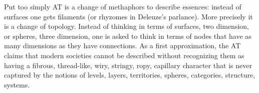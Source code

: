\begin{citacaoabnt}
Put too simply AT is a change of methaphors to describe essences: instead of surfaces one gets filaments (or rhyzomes in Deleuze's parlance). More precisely it is a change of topology. Instead of thinking in terms of surfaces, two dimension, or spheres, three dimension, one is asked to think in terms of nodes that have as many dimensions as they have connections. As a first approximation, the AT claims that modern societies cannot be described without recognizing them as having a fibrous, thread-like, wiry, stringy, ropy, capillary character that is never captured by the notions of levels, layers, territories, spheres, categories, structure, systems. \parencite[p.~3]{latour1996clarifications}
\end{citacaoabnt}

